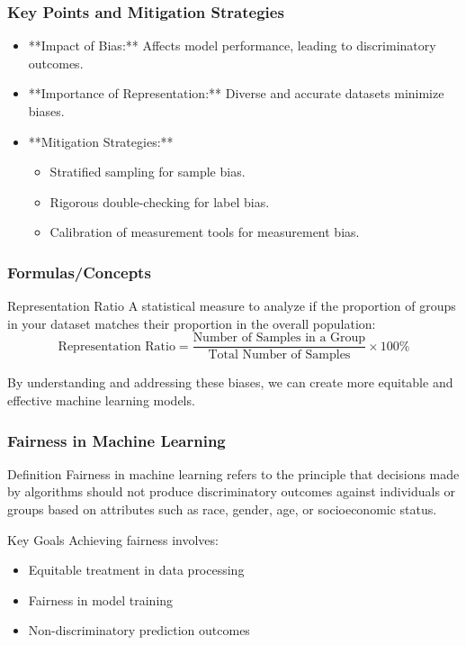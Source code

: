 \documentclass[aspectratio=169]{beamer}
\begin{document}
\begin{frame}[fragile]
    \frametitle{Key Points and Mitigation Strategies}
    \begin{itemize}
        \item **Impact of Bias:** Affects model performance, leading to discriminatory outcomes.
        \item **Importance of Representation:** Diverse and accurate datasets minimize biases.
        \item **Mitigation Strategies:**
        \begin{itemize}
            \item Stratified sampling for sample bias.
            \item Rigorous double-checking for label bias.
            \item Calibration of measurement tools for measurement bias.
        \end{itemize}
    \end{itemize}
\end{frame}

\begin{frame}[fragile]
    \frametitle{Formulas/Concepts}
    \begin{block}{Representation Ratio}
        A statistical measure to analyze if the proportion of groups in your dataset matches their proportion in the overall population:
        \begin{equation}
            \text{Representation Ratio} = \frac{\text{Number of Samples in a Group}}{\text{Total Number of Samples}} \times 100\%
        \end{equation}
    \end{block}
    By understanding and addressing these biases, we can create more equitable and effective machine learning models.
\end{frame}

\begin{frame}[fragile]
    \frametitle{Fairness in Machine Learning}
    \begin{block}{Definition}
        Fairness in machine learning refers to the principle that decisions made by algorithms should not produce discriminatory outcomes against individuals or groups based on attributes such as race, gender, age, or socioeconomic status.
    \end{block}
    \begin{block}{Key Goals}
        Achieving fairness involves:
        \begin{itemize}
            \item Equitable treatment in data processing
            \item Fairness in model training
            \item Non-discriminatory prediction outcomes
        \end{itemize}
    \end{block}
\end{frame}
\end{document}
